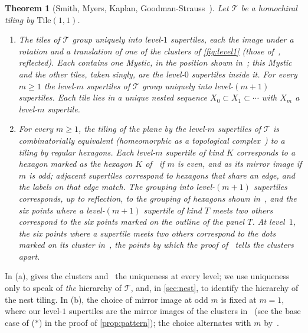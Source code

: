 \documentclass[11pt]{amsart}
\newtheorem{theorem}{Theorem}[section]
\theoremstyle{definition}
\theoremstyle{remark}
\newcommand{\Tile}{\mathrm{Tile}(1,1)}
\newcommand{\T}{\mathcal T}
\begin{document}
\begin{theorem}[Smith, Myers, Kaplan, Goodman-Strauss~\cite{SMKGS-spectre}]\label{thm:smkgs}
Let $\T$ be a homochiral tiling by $\Tile$.
\begin{enumerate}[label=\textup{(\alph*)}]
\item \textup{\cite[Thms.~2.2, 3.1, 4.1, \S5, Fig.~2.1]{SMKGS-spectre}} The tiles of $\T$ group uniquely into level-$1$
supertiles, each the image under a rotation and a translation of one of the clusters of \cref{fig:level1} (those
of~\cite[Fig.~2.1]{SMKGS-spectre}, reflected). Each contains one Mystic, in the position shown
in~\cite[Fig.~2.1]{SMKGS-spectre}; this Mystic and the other
tiles, taken singly, are the level-$0$ supertiles inside it. For every $m\ge1$ the level-$m$ supertiles of $\T$ group
uniquely into level-$(m+1)$ supertiles. Each tile lies in a unique nested sequence $X_0\subset X_1\subset\cdots$ with
$X_m$ a level-$m$ supertile.
\item \textup{\cite[Thms.~3.1, 4.1, 5.1, \S5, Fig.~4.1]{SMKGS-spectre}} For every $m\ge 1$, the tiling of the plane by the level-$m$
supertiles of $\T$ is combinatorially equivalent (homeomorphic as a topological complex~\cite[\S2.2]{SMKGS-spectre}) to a
tiling by regular hexagons. Each level-$m$ supertile of kind $K$ corresponds to a hexagon marked as the hexagon $K$
of~\cite[Fig.~4.2]{SMKGS-spectre} if $m$ is even, and as its mirror image if $m$ is odd; adjacent supertiles correspond
to hexagons that share an edge, and the labels on that edge match. The grouping into level-$(m+1)$ supertiles
corresponds, up to reflection, to the grouping of hexagons shown in~\cite[Fig.~5.1]{SMKGS-spectre}, and the six points
where a level-$(m+1)$ supertile of kind $T$ meets two others correspond to the six points marked on the outline of the
panel $T$. At level~$1$, the six points where a supertile meets two others correspond to the dots marked on its cluster
in~\cite[Fig.~4.1]{SMKGS-spectre}, the points by which the proof of~\cite[Thm.~4.1]{SMKGS-spectre} tells the clusters
apart.
\end{enumerate}
\end{theorem}

In (a), \cite[Thm.~4.1]{SMKGS-spectre} gives the clusters and~\cite[Thm.~2.2]{SMKGS-spectre} the uniqueness at every
level; we use uniqueness only to speak of \emph{the} hierarchy of $\T$, and, in \cref{sec:nest}, to identify the hierarchy of
the nest tiling. In (b), the choice of mirror image at odd $m$ is
fixed at $m=1$, where our level-$1$ supertiles are the mirror images of the clusters in~\cite[Figs.~2.1,
4.1]{SMKGS-spectre} (see the base case of ($\ast$) in the proof of \cref{prop:pattern}); the choice alternates with $m$
by~\cite[Thm.~5.1]{SMKGS-spectre}.
\end{document}

